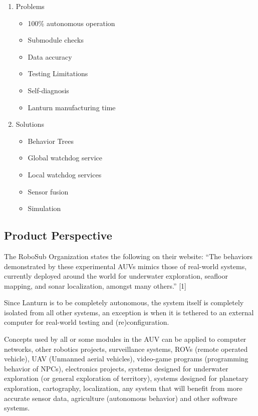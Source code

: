 \begin{enumerate}
    \item Problems
        \begin{itemize}
            \item 100\% autonomous operation
            \item Submodule checks
            \item Data accuracy
            \item Testing Limitations
            \item Self-diagnosis
            \item Lanturn manufacturing time
        \end{itemize}
    \item Solutions
        \begin{itemize}
            \item Behavior Trees
            \item Global watchdog service
            \item Local watchdog services
            \item Sensor fusion
            \item Simulation
        \end{itemize}
\end{enumerate}

\subsection{Product Perspective}
\label{sec:perspective}

The RoboSub Organization states the following on their website: “The behaviors
demonstrated by these experimental AUVs mimics those of real-world systems,
currently deployed around the world for underwater exploration, seafloor
mapping, and sonar localization, amongst many others.” [1] 
\par

Since Lanturn is to be completely autonomous, the system itself is completely
isolated from all other systems, an exception is when it is tethered to an
external computer for real-world testing and (re)configuration. 
\par

Concepts used by all or some modules in the AUV can be applied to computer
networks, other robotics projects, surveillance systems, ROVs (remote operated
vehicle), UAV (Unmanned aerial vehicles), video-game programs (programming
behavior of NPCs), electronics projects, systems designed for underwater
exploration (or general exploration of territory), systems designed for
planetary exploration, cartography, localization, any system that will benefit
from more accurate sensor data, agriculture (autonomous behavior) and other
software systems.
\par

